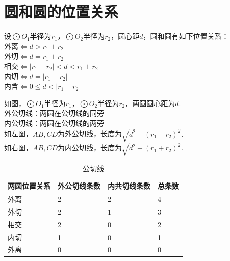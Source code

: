\section{圆和圆的位置关系}
\begin{theorem}
    设$\bigodot O_1$半径为$r_1$，$\bigodot O_2$半径为$r_2$，圆心距$d$，圆和圆有如下位置关系： \\
    外离$\Leftrightarrow d > r_1+r_2$ \\
    外切$\Leftrightarrow d = r_1+r_2$ \\
    相交$\Leftrightarrow |r_1-r_2|<d < r_1+r_2$ \\
    内切$\Leftrightarrow d = |r_1-r_2|$ \\
    内含$\Leftrightarrow 0 \le d < |r_1-r_2|$
\end{theorem}
\begin{theorem}
    如图，$\bigodot O_1$半径为$r_1$，$\bigodot O_2$半径为$r_2$，两圆圆心距为$d$. \\
    外公切线：两圆在公切线的同旁 \\
    内公切线：两圆在公切线的两旁 \\
    如左图，$AB,CD$为外公切线，长度为$\sqrt{d^2-(r_1-r_2)^2}.$ \\
    如右图，$AB,CD$为内公切线，长度为$\sqrt{d^2-(r_1+r_2)^2}.$
\end{theorem}
\begin{table}[H]
    \centering
    \caption{公切线}
    \begin{tabular}{l|l|l|l}
        \hline
        \hline
        两圆位置关系 & 外公切线条数 & 内共切线条数 & 总条数 \\
        \hline
        外离     & 2      & 2      & 4   \\
        外切     & 2      & 1      & 3   \\
        相交     & 2      & 0      & 2   \\
        内切     & 1      & 0      & 1   \\
        外离     & 0      & 0      & 0   \\
        \hline
        \hline
    \end{tabular}
\end{table}
\clearpage
